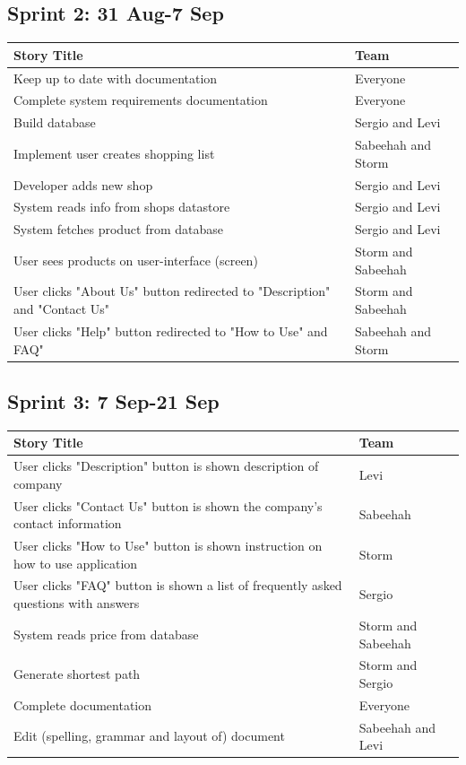 \documentclass[12pt]{article}
\begin{document}
\subsection{Sprint 2: 31 Aug-7 Sep}
\begin{tabu} to \textwidth{| X[l] | X[l] |} \hline
\textbf{Story Title} & \textbf{Team}\\
\hline
Keep up to date with documentation & Everyone\\ \hline
Complete system requirements documentation & Everyone\\ \hline
Build database & Sergio and Levi\\ \hline
Implement user creates shopping list & Sabeehah and Storm\\ \hline
Developer adds new shop & Sergio and Levi\\ \hline
System reads info from shops datastore & Sergio and Levi\\ \hline
System fetches product from database & Sergio and Levi\\ \hline
User sees products on user-interface (screen) & Storm and Sabeehah\\ \hline
User clicks "About Us" button redirected to "Description" and "Contact Us" & Storm and Sabeehah\\ \hline
User clicks "Help" button redirected to "How to Use" and FAQ" & Sabeehah and Storm\\ \hline
\end{tabu}

\subsection{Sprint 3: 7 Sep-21 Sep}
\begin{tabu} to \textwidth{| X[l] | X[l] |} \hline
\textbf{Story Title} & \textbf{Team}\\
\hline
User clicks "Description" button is shown description of company & Levi\\ \hline
User clicks "Contact Us" button is shown the company's contact information & Sabeehah\\ \hline
User clicks "How to Use" button is shown instruction on how to use application & Storm\\ \hline
User clicks "FAQ" button is shown a list of frequently asked questions with answers & Sergio\\ \hline
System reads price from database & Storm and Sabeehah\\ \hline
Generate shortest path & Storm and Sergio\\ \hline
Complete documentation & Everyone\\ \hline
Edit (spelling, grammar and layout of) document & Sabeehah and Levi\\ \hline
\end{tabu}
\end{document}
